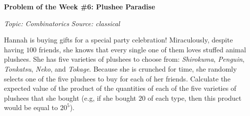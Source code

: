 \begin{potw}\vspace{5pt}
{\large\textbf{Problem of the Week \#6: Plushee Paradise}}\vspace{5pt}

\textit{Topic: Combinatorics}\newline
\textit{Source: classical}\V

Hannah is buying gifts for a special party celebration! Miraculously, despite having $100$ friends, she knows that every single one of them loves stuffed animal plushees. She has five varieties of plushees to choose from: \textit{Shirokuma}, \textit{Penguin}, \textit{Tonkatsu}, \textit{Neko}, and \textit{Tokage}. Because she is crunched for time, she randomly selects one of the five plushees to buy for each of her friends. Calculate the expected value of the product of the quantities of each of the five varieties of plushees that she bought (e.g, if she bought $20$ of each type, then this product would be equal to $20^5$).
\end{potw}\V
